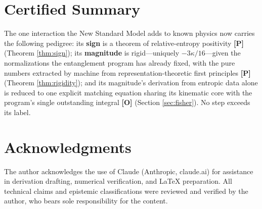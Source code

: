 \documentclass[11pt]{article}
\theoremstyle{definition}
\newcommand{\pP}{\textbf{[P]}}
\newcommand{\pO}{\textbf{[O]}}
\begin{document}
\section{Certified Summary}

The one interaction the New Standard Model adds to known physics now
carries the following pedigree: its \textbf{sign} is a theorem of
relative-entropy positivity \pP{} (Theorem \ref{thm:sign}); its
\textbf{magnitude} is rigid---uniquely $-3\kappa/16$---given the
normalizations the entanglement program has already fixed, with the pure
numbers extracted by machine from representation-theoretic first
principles \pP{} (Theorem \ref{thm:rigidity}); and its magnitude's
derivation from entropic data alone is reduced to one explicit matching
equation sharing its kinematic core with the program's single outstanding
integral \pO{} (Section \ref{sec:fisher}). No step exceeds its label.

\section*{Acknowledgments}
The author acknowledges the use of Claude (Anthropic, claude.ai) for
assistance in derivation drafting, numerical verification, and \LaTeX{}
preparation. All technical claims and epistemic classifications were
reviewed and verified by the author, who bears sole responsibility for
the content.
\end{document}
